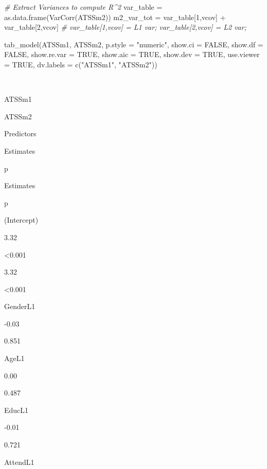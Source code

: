 \documentclass[
  11pt,
]{book}
\newenvironment{Shaded}{\begin{snugshade}}{\end{snugshade}}
\newcommand{\AttributeTok}[1]{\textcolor[rgb]{0.77,0.63,0.00}{#1}}
\newcommand{\CommentTok}[1]{\textcolor[rgb]{0.56,0.35,0.01}{\textit{#1}}}
\newcommand{\ConstantTok}[1]{\textcolor[rgb]{0.00,0.00,0.00}{#1}}
\newcommand{\DecValTok}[1]{\textcolor[rgb]{0.00,0.00,0.81}{#1}}
\newcommand{\FunctionTok}[1]{\textcolor[rgb]{0.00,0.00,0.00}{#1}}
\newcommand{\NormalTok}[1]{#1}
\newcommand{\OtherTok}[1]{\textcolor[rgb]{0.56,0.35,0.01}{#1}}
\newcommand{\SpecialCharTok}[1]{\textcolor[rgb]{0.00,0.00,0.00}{#1}}
\newcommand{\StringTok}[1]{\textcolor[rgb]{0.31,0.60,0.02}{#1}}
\begin{document}
\begin{Shaded}
\begin{Highlighting}[]
\CommentTok{\# Extract Variances to compute R\^{}2}
\NormalTok{  var\_table }\OtherTok{=} \FunctionTok{as.data.frame}\NormalTok{(}\FunctionTok{VarCorr}\NormalTok{(ATSSm2))}
\NormalTok{  m2\_var\_tot }\OtherTok{=}\NormalTok{ var\_table[}\DecValTok{1}\NormalTok{,}\StringTok{\textquotesingle{}vcov\textquotesingle{}}\NormalTok{] }\SpecialCharTok{+}\NormalTok{ var\_table[}\DecValTok{2}\NormalTok{,}\StringTok{\textquotesingle{}vcov\textquotesingle{}}\NormalTok{] }\CommentTok{\# var\_table[1,\textquotesingle{}vcov\textquotesingle{}] = L1 var; var\_table[2,\textquotesingle{}vcov\textquotesingle{}] = L2 var; }

\FunctionTok{tab\_model}\NormalTok{(ATSSm1, ATSSm2, }\AttributeTok{p.style =} \StringTok{"numeric"}\NormalTok{, }\AttributeTok{show.ci =} \ConstantTok{FALSE}\NormalTok{, }\AttributeTok{show.df =} \ConstantTok{FALSE}\NormalTok{, }\AttributeTok{show.re.var =} \ConstantTok{TRUE}\NormalTok{, }\AttributeTok{show.aic =} \ConstantTok{TRUE}\NormalTok{, }\AttributeTok{show.dev =} \ConstantTok{TRUE}\NormalTok{, }\AttributeTok{use.viewer =} \ConstantTok{TRUE}\NormalTok{, }\AttributeTok{dv.labels =} \FunctionTok{c}\NormalTok{(}\StringTok{"ATSSm1"}\NormalTok{, }\StringTok{"ATSSm2"}\NormalTok{))}
\end{Highlighting}
\end{Shaded}

~

ATSSm1

ATSSm2

Predictors

Estimates

p

Estimates

p

(Intercept)

3.32

\textless0.001

3.32

\textless0.001

GenderL1

-0.03

0.851

AgeL1

0.00

0.487

EducL1

-0.01

0.721

AttendL1
\end{document}
